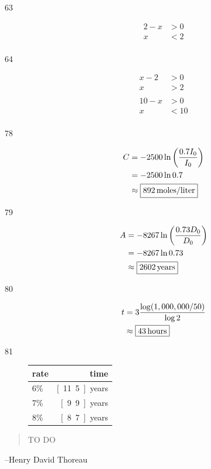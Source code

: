 \documentclass{exam}
\begin{document}
\begin{description}

    \item[63]
      \begin{align*}
        2 - x & > 0 \\
        x     & < 2 \\
      \end{align*}


    \item[64]
      \begin{align*}
        x-2 & >0 \\
        x   & >2 \\
        \\
        10 - x & > 0 \\
        x      & < 10 \\
      \end{align*}


    \item[78]
      \begin{align*}
        C &= -2500 \ln \left( \frac{0.7 I_0}{I_0} \right) \\
          &= -2500 \ln 0.7 \\
          &\approx \boxed{\unit[892]{moles/liter}} \\
      \end{align*}

    \item[79]
      \begin{align*}
        A &= -8267 \ln \left( \frac{0.73 D_0}{D_0} \right) \\
          &= -8267  \ln 0.73 \\
          &\approx \boxed{\unit[2602]{years}} \\
      \end{align*}

    \item[80]
      \begin{align*}
        t &= 3 \frac{\log(1,000,000 / 50)}{\log 2} \\
          &\approx \boxed{\unit[43]{hours}} \\
      \end{align*}

    \item[81]
      \begin{tabular}[H]{lr}
        \toprule
        rate & time \\
        \midrule
        6\% & \unit[11.5]{years} \\
        7\% & \unit[9.9]{years} \\
        8\% & \unit[8.7]{years} \\
        \bottomrule
      \end{tabular}
    \end{description}

  \else
    \vspace{6 cm}
    \begin{quote}
      \begin{em}
        TO DO
      \end{em}
    \end{quote}

    \hspace{1 cm} --Henry David Thoreau
  \fi
\end{document}
